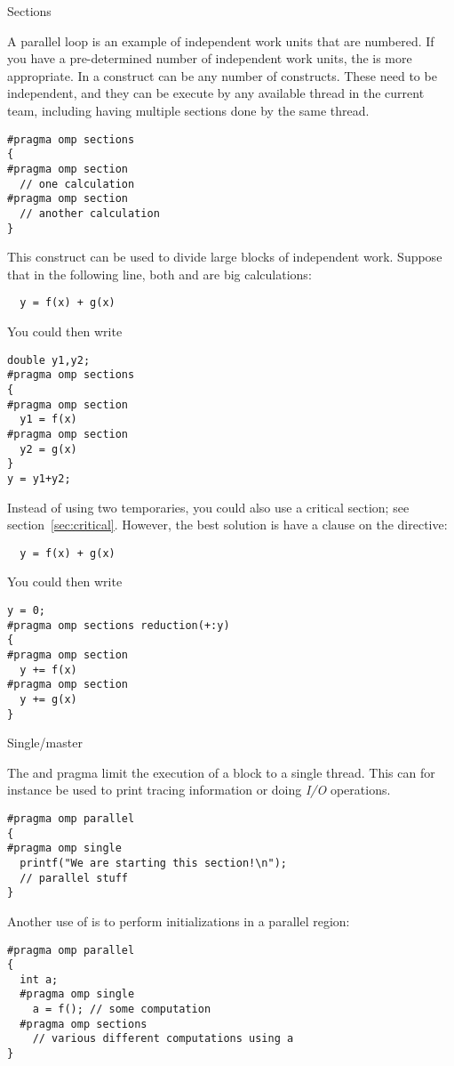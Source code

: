  {Sections}

A parallel loop is an example of independent work units that are numbered.
If you have a pre-determined number of independent work units, 
the  is more appropriate. In a  construct
can be any number of  constructs. These need to be
independent, and they can be execute by any available thread in the current team,
including having multiple sections done by the same thread.
\begin{verbatim}
#pragma omp sections
{
#pragma omp section
  // one calculation
#pragma omp section
  // another calculation
}
\end{verbatim}

This construct can be used to divide large blocks of independent work.
Suppose that in the following line, both  and 
are big calculations:
\begin{verbatim}
  y = f(x) + g(x)
\end{verbatim}
You could then write
\begin{verbatim}
double y1,y2;
#pragma omp sections
{
#pragma omp section
  y1 = f(x)
#pragma omp section
  y2 = g(x)
}
y = y1+y2;
\end{verbatim}
Instead of using two temporaries, you could also use a critical
section; see section~\ref{sec:critical}.  However, the best solution
is have a  clause on the  directive:
\begin{verbatim}
  y = f(x) + g(x)
\end{verbatim}
You could then write
\begin{verbatim}
y = 0;
#pragma omp sections reduction(+:y)
{
#pragma omp section
  y += f(x)
#pragma omp section
  y += g(x)
}
\end{verbatim}

 {Single/master}

The  and  pragma
limit the execution of a block to a single thread. 
This can for instance be used to print tracing information
or doing \emph{I/O} operations.
\begin{verbatim}
#pragma omp parallel
{
#pragma omp single
  printf("We are starting this section!\n");
  // parallel stuff
}
\end{verbatim}
Another use of  is to perform initializations
in a parallel region:
\begin{verbatim}
#pragma omp parallel
{
  int a;
  #pragma omp single
    a = f(); // some computation
  #pragma omp sections
    // various different computations using a
}
\end{verbatim}

